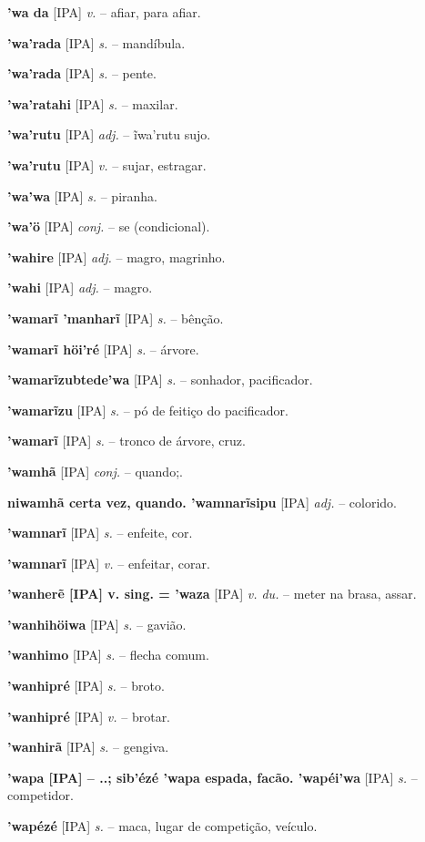 \textbf{'wa da} [IPA] \textit{v.} -- afiar, para afiar.

\textbf{'wa'rada} [IPA] \textit{s.} -- mandíbula.

\textbf{'wa'rada} [IPA] \textit{s.} -- pente.

\textbf{'wa'ratahi} [IPA] \textit{s.} -- maxilar.

\textbf{'wa'rutu} [IPA] \textit{adj.} -- ĩwa'rutu sujo.

\textbf{'wa'rutu} [IPA] \textit{v.} -- sujar, estragar.

\textbf{'wa'wa} [IPA] \textit{s.} -- piranha.

\textbf{'wa'ö} [IPA] \textit{conj.} -- se (condicional).

\textbf{'wahire} [IPA] \textit{adj.} -- magro, magrinho.

\textbf{'wahi} [IPA] \textit{adj.} -- magro.

\textbf{'wamarĩ 'manharĩ} [IPA] \textit{s.} -- bênção.

\textbf{'wamarĩ höi'ré} [IPA] \textit{s.} -- árvore.

\textbf{'wamarĩzubtede'wa} [IPA] \textit{s.} -- sonhador, pacificador.

\textbf{'wamarĩzu} [IPA] \textit{s.} -- pó de feitiço do pacificador.

\textbf{'wamarĩ} [IPA] \textit{s.} -- tronco de árvore, cruz.

\textbf{'wamhã} [IPA] \textit{conj.} -- quando;.

\textbf{niwamhã certa vez, quando. 'wamnarĩsipu} [IPA] \textit{adj.} -- colorido.

\textbf{'wamnarĩ} [IPA] \textit{s.} -- enfeite, cor.

\textbf{'wamnarĩ} [IPA] \textit{v.} -- enfeitar, corar.

\textbf{'wanherẽ [IPA] v. sing. = 'waza} [IPA] \textit{v. du.} -- meter na brasa, assar.

\textbf{'wanhihöiwa} [IPA] \textit{s.} -- gavião.

\textbf{'wanhimo} [IPA] \textit{s.} -- flecha comum.

\textbf{'wanhipré} [IPA] \textit{s.} -- broto.

\textbf{'wanhipré} [IPA] \textit{v.} -- brotar.

\textbf{'wanhirã} [IPA] \textit{s.} -- gengiva.

\textbf{'wapa [IPA]  -- ..; sib'ézé 'wapa espada, facão. 'wapéi'wa} [IPA] \textit{s.} -- competidor.

\textbf{'wapézé} [IPA] \textit{s.} -- maca, lugar de competição, veículo.

